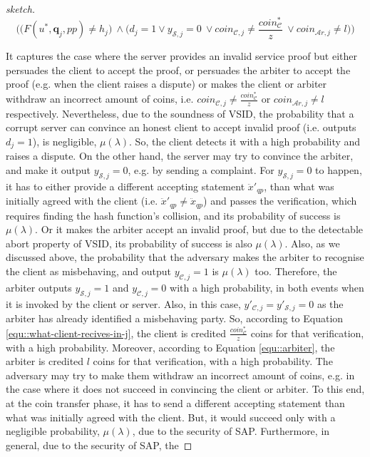 \begin{proof}[sketch]
     $$\Bigg(\Big(F(u^{\scriptscriptstyle *}, \bm{q}_{\scriptscriptstyle j}, {pp})\neq h_{\scriptscriptstyle j}\Big) \ \wedge \Big(d_{\scriptscriptstyle j}=1	\vee y_{\scriptscriptstyle \mathcal {S},j}=0 \ \vee coin_{\scriptscriptstyle\mathcal{C},j}\neq \frac{coin_{\scriptscriptstyle\mathcal C}^{\scriptscriptstyle*}}{z} \ \vee  coin_{\scriptscriptstyle\mathcal{A}r,j}\neq l\Big)\Bigg)$$
     
     It captures the case where the server provides an invalid service proof but either persuades the client to accept the proof, or  persuades the arbiter to accept the proof (e.g. when the client raises a dispute) or makes the client or arbiter withdraw an incorrect amount of coins, i.e.    $coin_{\scriptscriptstyle\mathcal{C},j}\neq \frac{coin_{\scriptscriptstyle\mathcal C}^{\scriptscriptstyle*}}{z}$ or $coin_{\scriptscriptstyle\mathcal{A}r,j}\neq l$ respectively.   Nevertheless, due to the soundness of VSID, the probability that a corrupt server can convince an honest client to accept invalid proof (i.e. outputs $d_{\scriptscriptstyle j}=1$), is negligible, $\mu(\lambda)$. So, the client detects it with a high probability and raises a dispute.  On the other hand, the server may try to convince the arbiter, and make it output $y_{\scriptscriptstyle \mathcal {S},j}=0$, e.g. by sending a complaint. For $y_{\scriptscriptstyle \mathcal {S},j}=0$ to happen, it has to either provide a different accepting statement $\ddot{x}'_{\scriptscriptstyle qp}$, than what was initially agreed with the client (i.e. $\ddot{x}'_{\scriptscriptstyle qp}\neq \ddot{x}_{\scriptscriptstyle qp}$) and passes the verification, which   requires finding the hash function's collision, and its probability of success is   $\mu(\lambda)$. Or it makes the arbiter  accept an invalid proof, but due to the detectable abort property of VSID, its probability of success is also  $\mu(\lambda)$. Also, as we discussed above, the probability that the adversary makes the arbiter to recognise the client as misbehaving, and output $y_{\scriptscriptstyle \mathcal {C},j}=1$ is  $\mu(\lambda)$ too. Therefore, the arbiter outputs $y_{\scriptscriptstyle \mathcal {S},j}=1$ and $y_{\scriptscriptstyle \mathcal {C},j}=0$  with a high probability, in both events when it is invoked by the client or  server. Also,  in this case, $y'_{\scriptscriptstyle \mathcal {C},j}=y'_{\scriptscriptstyle \mathcal {S},j}=0$ as the arbiter has already identified a misbehaving party. So, according to Equation \ref{equ::what-client-recives-in-j}, the client is credited $\frac{coin_{\scriptscriptstyle\mathcal C}^{\scriptscriptstyle*}}{z}$ coins for that verification, with a high probability.      Moreover, according to Equation \ref{equ::arbiter}, the arbiter is credited $l$ coins for that verification, with a high probability.  The adversary may  try to  make them withdraw an incorrect amount of coins, e.g. in the case where it does not succeed in convincing the client or arbiter. To this end,  at the coin transfer phase, it has to send a  different accepting statement  than what was initially agreed with the client. But, it would succeed only with a negligible probability, $\mu(\lambda)$, due to the security of SAP. Furthermore, in   general, due to the security of SAP, the 
\end{proof}

